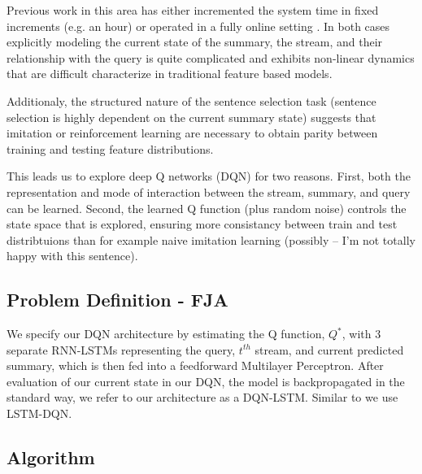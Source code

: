 \documentclass[12pt]{article}
\begin{document}
  Previous work in this area has either incremented the system time in fixed
  increments (e.g. an hour) 
  \cite{mccreadie2014incremental,kedzie2015predicting} or operated in
  a fully online setting \cite{guo2013updating,kedzie2016real}. In both cases 
  explicitly 
  modeling the current state of the summary, the stream, and their relationship
  with the query is quite complicated and exhibits non-linear dynamics that 
  are difficult characterize in traditional feature based models.

  Additionaly, the structured nature of the sentence selection task 
  (sentence selection is
  highly dependent on the current summary state) suggests that imitation 
  or reinforcement learning are necessary to obtain parity between training
  and testing feature distributions. 

  This leads us to explore deep Q networks (DQN) for two reasons. 
  First, both the 
  representation and mode of interaction between the stream, summary, and 
  query can be learned. 
  Second, the learned Q function (plus random noise) controls the state 
  space that is explored, ensuring more consistancy between train and test 
  distribtuions than for example naive imitation learning 
  (possibly -- I'm not totally happy with this sentence).

\subsection{Problem Definition - FJA}
We specify our DQN architecture by estimating the Q function, $Q^*$, with 3 separate RNN-LSTMs representing the query, $t^{th}$ stream, and current predicted summary, which is then fed into a feedforward Multilayer Perceptron. After evaluation of our current state in our DQN, the model is backpropagated in the standard way, we refer to our architecture as a DQN-LSTM. Similar to \cite{narasimhan2015language} we use LSTM-DQN.

\subsection{Algorithm}
\end{document}
